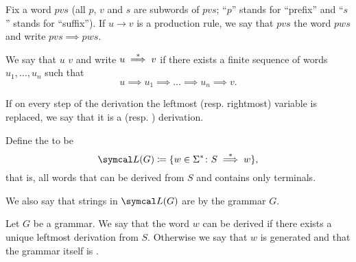 \begin{definition}\label{def:grammar_derivation}\cite[104,108]{Sipser2013}
  Fix a word \( pvs \) (all \( p \), \( v \) and \( s \) are subwords of \( pvs \); \enquote{\( p \)} stands for \enquote{prefix} and \enquote{\( s \)} stands for \enquote{suffix}). If \( u \to v \) is a production rule, we say that \( pvs \)  the word \( pws \) and write \( pvs \implies pws \).

  We say that \( u \)  \( v \) and write \( u \overset * \implies v \) if there exists a finite sequence of words \( u_1, \ldots, u_n \) such that
  \begin{equation*}
    u \implies u_1 \implies \ldots \implies u_n \implies v.
  \end{equation*}

  If on every step of the derivation the leftmost (resp. rightmost) variable is replaced, we say that it is a  (resp. ) derivation.

  Define the  to be
  \begin{equation*}
    \Cal{L}(G) \coloneqq \{ w \in \Sigma^* \colon S \Derives w \},
  \end{equation*}
  that is, all words that can be derived from \( S \) and contains only terminals.

  We also say that strings in \( \Cal{L}(G) \) are  by the grammar \( G \).
\end{definition}

\begin{definition}\label{def:ambiguous_grammar}\cite[definition 2.7]{Sipser2013}
  Let \( G \) be a grammar. We say that the word \( w \) can be derived  if there exists a unique leftmost derivation from \( S \). Otherwise we say that \( w \) is generated  and that the grammar itself is .
\end{definition}

